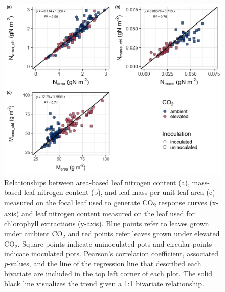 \newpage
\begin{figure}
    \centering
    \includegraphics[width=\columnwidth]{ch5_NxCO2xI/figs/NxCO2xI_figS1_leafN_chl.jpg}
    \caption[Relationships between area-based leaf nitrogen content, mass-based leaf nitrogen content, and leaf mass per unit leaf area measured on the focal leaf used to generate CO\textsubscript{2} response curves and leaf nitrogen content measured on the leaf used for chlorophyll extractions]{Relationships between area-based leaf nitrogen content (a), mass-based leaf nitrogen content (b), and leaf mass per unit leaf area (c) measured on the focal leaf used to generate CO\textsubscript{2} response curves (x-axis) and leaf nitrogen content measured on the leaf used for chlorophyll extractions (y-axis). Blue points refer to leaves grown under ambient CO$_2$ and red points refer leaves grown under elevated CO$_2$. Square points indicate uninoculated pots and circular points indicate inoculated pots. Pearson's correlation coefficient, associated \textit{p}-values, and the line of the regression line that described each bivariate are included in the top left corner of each plot. The solid black line visualizes the trend given a 1:1 bivariate relationship.}
    \label{fig:figure.d1}
\end{figure}
\clearpage

